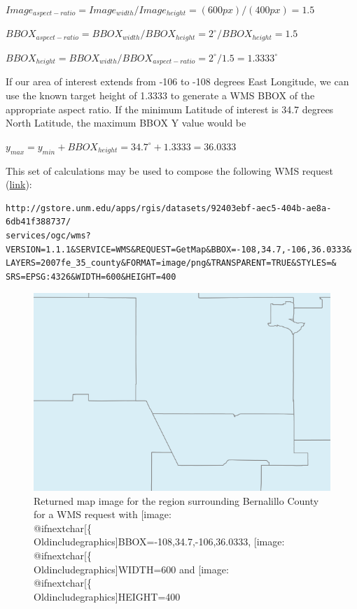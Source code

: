 \documentclass[]{book}
\makeatletter
\def\ScaleIfNeeded{%
  \ifdim\Gin@nat@width>.5\linewidth
    .5\linewidth
  \else
    \Gin@nat@width
  \fi
}
\let\Oldincludegraphics\texttt{[image: \%
 \\catcode`\\@=11\\relax\%
 \%\\gdef\\includegraphics\{\\@ifnextchar[\{\\Oldincludegraphics]}{\Oldincludegraphics[width=\ScaleIfNeeded]}}%
\gdef\texttt{[image: \\@ifnextchar[\{\\Oldincludegraphics]}{\Oldincludegraphics[max size={.75\textwidth}{.75\textheight}]}}%
\makeatother
\begin{document}
\(Image_{aspect-ratio} = Image_{width} / Image_{height} = (600px) / (400px) = 1.5\)

\(BBOX_{aspect-ratio} = BBOX_{width} / BBOX_{height} = 2^{\circ} / BBOX_{height} = 1.5\)

\(BBOX_{height} = BBOX_{width} / BBOX_{aspect-ratio} = 2^{\circ} / 1.5 = 1.3333^{\circ}\)

If our area of interest extends from -106 to -108 degrees East
Longitude, we can use the known target height of 1.3333 to generate a
WMS BBOX of the appropriate aspect ratio. If the minimum Latitude of
interest is 34.7 degrees North Latitude, the maximum BBOX Y value would
be

\(y_{max} = y_{min} + BBOX_{height} = 34.7^{\circ} + 1.3333 = 36.0333\)

This set of calculations may be used to compose the following WMS
request
(\href{http://gstore.unm.edu/apps/rgis/datasets/92403ebf-aec5-404b-ae8a-6db41f388737/services/ogc/wms?VERSION=1.1.1\&SERVICE=WMS\&REQUEST=GetMap\&BBOX=-108,34.7,-106,36.0333\&LAYERS=g_2007fe_35_county\&FORMAT=image/png\&TRANSPARENT=TRUE\&STYLES=\&SRS=EPSG:4326\&WIDTH=600\&HEIGHT=400}{link}):

\begin{verbatim}
http://gstore.unm.edu/apps/rgis/datasets/92403ebf-aec5-404b-ae8a-6db41f388737/
services/ogc/wms?VERSION=1.1.1&SERVICE=WMS&REQUEST=GetMap&BBOX=-108,34.7,-106,36.0333&
LAYERS=2007fe_35_county&FORMAT=image/png&TRANSPARENT=TRUE&STYLES=&
SRS=EPSG:4326&WIDTH=600&HEIGHT=400
\end{verbatim}

\begin{figure}[htbp]
\centering
\includegraphics{images/bernalillo_03.png}
\caption{Returned map image for the region surrounding Bernalillo County
for a WMS request with \texttt{BBOX=-108,34.7,-106,36.0333},
\texttt{WIDTH=600} and \texttt{HEIGHT=400}}
\end{figure}
\end{document}
